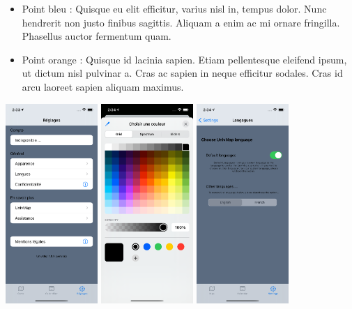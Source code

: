 \documentclass{article}
\begin{document}
\begin{itemize}
    \item Point bleu : Quisque eu elit efficitur, varius nisl in, tempus dolor. Nunc hendrerit non justo finibus
    sagittis. Aliquam a enim ac mi ornare fringilla. Phasellus auctor fermentum quam.

    \item Point orange : Quisque id lacinia sapien. Etiam pellentesque eleifend ipsum, ut dictum nisl pulvinar a.
    Cras ac sapien in neque efficitur sodales. Cras id arcu laoreet sapien aliquam maximus.
\end{itemize}

\vspace{10pt}   %

\begin{center}
    \includegraphics[width=35mm, scale=0.5]{setting.png}
    \includegraphics[width=35mm, scale=0.5]{setting_appearance.png}
    \includegraphics[width=35mm, scale=0.5]{setting_languageOn.png}

\end{center}
\end{document}

